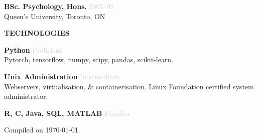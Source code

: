 \documentclass[a4paper,12pt,oneside]{book}
\newcommand{\headingsR}[1]{
    \vspace{2.5mm}
    \noindent\large\leftskip=0.15in\textbf{#1}
    \vspace{2.5mm}
}
\newcommand\listR[1]{
    \vspace{-2.5mm}\begin{itemize}[leftmargin=0.30in]\setlength\itemsep{1.5mm}{#1}\end{itemize}
}
\newcommand{\entryR}[3]{
    \noindent\small\leftskip=0.15in\textbf{#1}
        {\hfill\footnotesize\textcolor{lightgray}{#2}\\
            {\footnotesize\addfontfeature{} #3}\
            \vspace{1mm}
    }
}
\newcommand{\entrysmR}[2]{
    \noindent\small\leftskip=0.15in\textbf{#1}
        \hfill\footnotesize\textcolor{lightgray}{#2}\\
        \vspace{-4mm}
}
\begin{document}
\begin{minipage}[t]{\dimexpr0.37\textwidth+2\fboxrule+2\fboxsep\relax}
\entryR
{BSc. Psychology,  Hons.}{2005--09}
{Queen's University, Toronto, ON}


\headingsR{TECHNOLOGIES}

\entryR
{Python}{Proficient}
{Pytorch, tensorflow, numpy, scipy, pandas, scikit-learn.}

\entryR
{Unix Administration}{Intermediate}
{Webservers, virtualisation, \& containerisation. Linux Foundation certified system administrator.}

\entrysmR
{R, C, Java, SQL, MATLAB}{Familiar}













\end{minipage}

\begin{center}
\small{Compiled on \usdate\today.}
\end{center}
\end{document}
